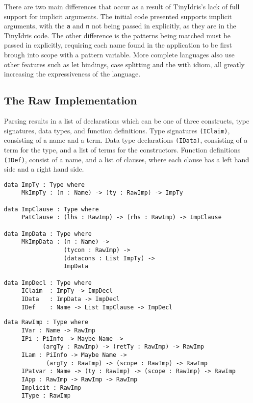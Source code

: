 \documentclass[a4paper]{article}
\begin{document}
There are two main differences that occur as a result of TinyIdris's lack of full
support for implicit arguments. The initial code presented supports
implicit arguments, with the \texttt{a} and \texttt{n} not being passed in explicitly,
as they are in the TinyIdris code. The other difference is the patterns
being matched must be passed in explicitly, requiring each name found 
in the application to be first brough into scope with a pattern 
variable. More complete languages also use other features such as let 
bindings, case splitting and the with idiom, all greatly increasing the
expressiveness of the language.

\subsection{The Raw Implementation}
\label{sec:orgbff7c18}
Parsing results in a list of declarations which can be one of three constructs, type signatures, data types, and function definitions.
Type signatures \texttt{(IClaim)}, consisting of a name and a term. Data type 
declarations \texttt{(IData)}, consisting of a term for the type, and a list of
terms for the constructors. Function definitions \texttt{(IDef)}, consist of a
name, and a list of clauses, where each clause has a left hand side and
a right hand side. 

\begin{center}
\begin{verbatim}
data ImpTy : Type where
	 MkImpTy : (n : Name) -> (ty : RawImp) -> ImpTy

data ImpClause : Type where
	 PatClause : (lhs : RawImp) -> (rhs : RawImp) -> ImpClause

data ImpData : Type where
	 MkImpData : (n : Name) -> 
				 (tycon : RawImp) ->
				 (datacons : List ImpTy) ->
				 ImpData

data ImpDecl : Type where
	 IClaim  : ImpTy -> ImpDecl
	 IData   : ImpData -> ImpDecl
	 IDef    : Name -> List ImpClause -> ImpDecl
\end{verbatim}
\end{center}

\begin{center}
\begin{verbatim}
data RawImp : Type where
	 IVar : Name -> RawImp
	 IPi : PiInfo -> Maybe Name ->
		   (argTy : RawImp) -> (retTy : RawImp) -> RawImp
	 ILam : PiInfo -> Maybe Name ->
			(argTy : RawImp) -> (scope : RawImp) -> RawImp
	 IPatvar : Name -> (ty : RawImp) -> (scope : RawImp) -> RawImp
	 IApp : RawImp -> RawImp -> RawImp
	 Implicit : RawImp
	 IType : RawImp
\end{verbatim}
\end{center}
\end{document}
